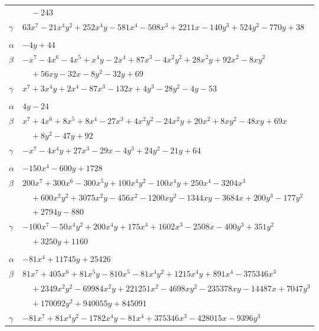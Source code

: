 \documentclass[11pt]{article}
\begin{document}
\begin{longtable}{@{}ll@{}}
 & $\quad -243$\\
$\gamma$ & $63x^{7}-21x^{4}y^{2}+252x^{4}y-581x^{4}-508x^{3}+2211x-140y^{3}+524y^{2}-770y+38$\\
\addlinespace[3pt]
\multicolumn{2}{@{}l}{$\{i,j\}=\{68,69\}$, $k_{ij}=2^{5}\cdot 3^{2}$}\\
$\alpha$ & $-4y+44$\\
$\beta$ & $-x^{7}-4x^{6}-4x^{5}+x^{4}y-2x^{4}+87x^{3}-4x^{2}y^{2}+28x^{2}y+92x^{2}-8xy^{2}$\\
 & $\quad +56xy-32x-8y^{2}-32y+69$\\
$\gamma$ & $x^{7}+3x^{4}y+2x^{4}-87x^{3}-132x+4y^{3}-28y^{2}-4y-53$\\
\addlinespace[3pt]
\multicolumn{2}{@{}l}{$\{i,j\}=\{68,70\}$, $k_{ij}=2^{5}\cdot 3^{2}$}\\
$\alpha$ & $4y-24$\\
$\beta$ & $x^{7}+4x^{6}+8x^{5}+8x^{4}-27x^{3}+4x^{2}y^{2}-24x^{2}y+20x^{2}+8xy^{2}-48xy+69x$\\
 & $\quad +8y^{2}-47y+92$\\
$\gamma$ & $-x^{7}-4x^{4}y+27x^{3}-29x-4y^{3}+24y^{2}-21y+64$\\
\addlinespace[3pt]
\multicolumn{2}{@{}l}{$\{i,j\}=\{69,77\}$, $k_{ij}=2^{4}\cdot 3\cdot 11^{2}$}\\
$\alpha$ & $-150x^{4}-600y+1728$\\
$\beta$ & $200x^{7}+300x^{6}-300x^{5}y+100x^{4}y^{2}-100x^{4}y+250x^{4}-3204x^{3}$\\
 & $\quad +600x^{2}y^{2}+3075x^{2}y-456x^{2}-1200xy^{2}-1344xy-3684x+200y^{3}-177y^{2}$\\
 & $\quad +2794y-880$\\
$\gamma$ & $-100x^{7}-50x^{4}y^{2}+200x^{4}y+175x^{4}+1602x^{3}-2508x-400y^{3}+351y^{2}$\\
 & $\quad +3250y+1160$\\
\addlinespace[3pt]
\multicolumn{2}{@{}l}{$\{i,j\}=\{70,104\}$, $k_{ij}=2^{7}\cdot 5^{2}\cdot 17$}\\
$\alpha$ & $-81x^{4}+11745y+25426$\\
$\beta$ & $81x^{7}+405x^{6}+81x^{5}y-810x^{5}-81x^{4}y^{2}+1215x^{4}y+891x^{4}-375346x^{3}$\\
 & $\quad +2349x^{2}y^{2}-69984x^{2}y+221251x^{2}-4698xy^{2}-235378xy-14487x+7047y^{3}$\\
 & $\quad +170092y^{2}+940055y+845091$\\
$\gamma$ & $-81x^{7}+81x^{4}y^{2}-1782x^{4}y-81x^{4}+375346x^{3}-428015x-9396y^{3}$\\

\end{longtable}
\end{document}
